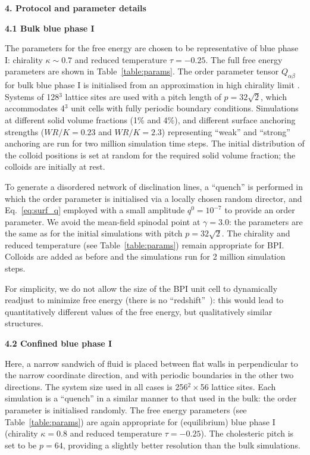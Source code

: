 \documentclass[12pt,twoside]{article}
\begin{document}
{\bf 4. Protocol and parameter details}

{\bf 4.1 Bulk blue phase I}

The parameters for the free energy are chosen to be representative
of blue phase I: chirality $\kappa \sim 0.7$ and reduced temperature
$\tau = -0.25$.
The full free energy parameters are shown in Table~\ref{table:params}.
The order parameter tensor $Q_{\alpha\beta}$ for bulk blue phase I is
initialised from an approximation in high chirality limit
\cite{blue1,oliver1}. Systems of 128$^3$ lattice sites are
used with a pitch length of $p = 32\sqrt{2}$, which accommodates 4$^3$
unit cells with fully periodic boundary conditions.
Simulations at different solid volume fractions (1\% and 4\%), and different 
surface anchoring strengths ($WR/K = 0.23$ and $WR/K = 2.3$) representing
``weak'' and ``strong'' anchoring are run for two million simulation
time steps.
The initial distribution of the colloid positions is set at random
for the required solid volume fraction; the colloids are initially
at rest.

To generate a disordered network of disclination lines, a ``quench''
is performed in which the order parameter is initialised via a
locally chosen random director, and
Eq.~\ref{eq:surf_q} employed with a small amplitude $q^0 = 10^{-7}$ to
provide an order parameter.
We avoid the mean-field spinodal point at $\gamma = 3.0$:
the parameters are the same as for the initial simulations with
pitch $p = 32\sqrt{2}$. The chirality and reduced temperature (see
Table~\ref{table:params}) remain appropriate for BPI.
Colloids are added as before and the simulations run for 2 million
simulation steps.

For simplicity, we do not allow the size of the BPI unit cell to 
dynamically readjust to minimize free energy (there is no 
``redshift''~\cite{blue1}): this would lead to quantitatively different 
values of the free energy, but qualitatively similar structures. 

{\bf 4.2 Confined blue phase I}

Here, a narrow sandwich of fluid is placed between flat walls in
perpendicular to the narrow coordinate direction, and with periodic
boundaries in the other two directions. The system size used in all
cases is 256$^2 \times$56 lattice sites. Each simulation is a ``quench''
in a similar manner to that used in the bulk: the order parameter is
initialised randomly. The free energy parameters (see Table~\ref{table:params})
are again appropriate for (equilibrium) blue phase I
(chirality $\kappa = 0.8$ and
reduced temperature $\tau = -0.25$). The cholesteric pitch is set
to be $p = 64$, providing a slightly better resolution than the bulk
simulations.
\end{document}
